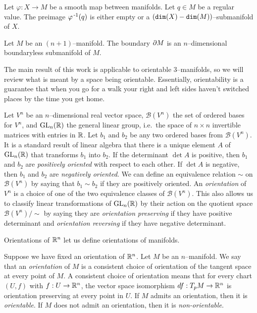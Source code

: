 \begin{theorem}
	Let $\varphi:X\to M$ be a smooth map between manifolds.
	Let $q\in M$ be a regular value.
	The preimage $\varphi^{\,\text{-}1}(q)$ is either empty or a $(\texttt{dim}(X)-\texttt{dim}(M))$--submanifold of $X$.
\end{theorem}

\begin{prop}
	\label{prop:boundariesaremanifolds}
	Let $M$ be an $(n+1)$--manifold.
	The boundary $\partial M$ is an $n$--dimensional boundaryless submanifold of $M$.
\end{prop}

The main result of this work is applicable to orientable 3--manifolds, so we will review what is meant by a space being orientable.
Essentially, orientability is a guarantee that when you go for a walk your right and left sides haven't switched places by the time you get home.

\begin{defn}
	\label{def:orientation}
	Let $V^n$ be an $n$--dimensional real vector space, $\mathcal{B}(V^n)$ the set of ordered bases for $V^n$, and $\textrm{GL}_{n}(\mathbb{R})$ the general linear group, i.e.\ the space of $n\times n$ invertible matrices with entries in $\mathbb{R}$.
	Let $b_1$ and $b_2$ be any two ordered bases from $\mathcal{B}(V^n)$.
	It is a standard result of linear algebra that there is a unique element $A$ of $\textrm{GL}_{n}(\mathbb{R})$ that transforms $b_1$ into $b_2$.
	If the determinant $\det A$ is positive, then $b_1$ and $b_2$ are \emph{positively oriented} with respect to each other.
	If $\det A$ is negative, then $b_1$ and $b_2$ are \emph{negatively oriented}.
	We can define an equivalence relation $\sim$ on $\mathcal{B}(V^n)$ by saying that $b_1\sim b_2$ if they are positively oriented.
	An \emph{orientation} of $V^n$ is a choice of one of the two equivalence classes of $\mathcal{B}(V^n)$.
	This also allows us to classify linear transformations of $\textrm{GL}_{n}(\mathbb{R})$ by their action on the quotient space $\mathcal{B}(V^n)/\sim$ by saying they are \emph{orientation preserving} if they have positive determinant and \emph{orientation reversing} if they have negative determinant.
\end{defn}

Orientations of $\mathbb{R}^n$ let us define orientations of manifolds.

\begin{defn}
	Suppose we have fixed an orientation of $\mathbb{R}^n$.
	Let $M$ be an $n$--manifold.
	We say that an \emph{orientation} of $M$ is a consistent choice of orientation of the tangent space at every point of $M$.
	A consistent choice of orientation means that for every chart $(U,f)$ with $f:U\to\mathbb{R}^n$, the vector space isomorphism $df:T_p M\to \mathbb{R}^n$ is orientation preserving at every point in $U$. 
	If $M$ admits an orientation, then it is \emph{orientable}.
	If $M$ does not admit an orientation, then it is \emph{non-orientable}.	
\end{defn}

